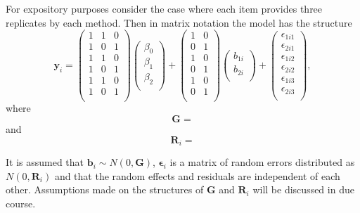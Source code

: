 \documentclass[12pt, a4paper]{report}
\theoremstyle{plain}
\theoremstyle{definition}
\theoremstyle{remark}
\begin{document}
	For expository purposes consider the case where each item provides three replicates by each method. Then in matrix notation the model has the structure
	\begin{equation}
	\boldsymbol{y}_{i} =
	\left(
	\begin{array}{ccc}
	1 & 1 & 0 \\
	1 & 0 & 1 \\
	1 & 1 & 0 \\
	1 & 0 & 1 \\
	1 & 1 & 0 \\
	1 & 0 & 1 \\
	\end{array}
	\right)
	\left(
	\begin{array}{c}         \beta_0 \\ \beta_1 \\ \beta_2 \\
	\end{array}
	\right)
	+  \left(
	\begin{array}{cc}
	1 & 0 \\
	0 & 1 \\
	1 & 0 \\
	0 & 1 \\
	1 & 0 \\
	0 & 1 \\
	\end{array}
	\right)\left(
	\begin{array}{c}
	b_{1i} \\   b_{2i} \\
	\end{array}
	\right)
	+
	\left(
	\begin{array}{c}
	\epsilon_{1i1} \\
	\epsilon_{2i1} \\
	\epsilon_{1i2} \\
	\epsilon_{2i2} \\
	\epsilon_{1i3} \\
	\epsilon_{2i3} \\
	\end{array}
	\right) ,
	\end{equation}
	where
	\[
	\boldsymbol{G} =
	\]
	and
	\[
	\boldsymbol{R}_i =
	\]
	
	It is assumed that $\boldsymbol{b}_i \sim N(0,\boldsymbol{G})$,
	$\boldsymbol{\epsilon}_i$ is a matrix of random errors distributed as $N(0,\boldsymbol{R}_i)$ and
	that the random effects and residuals are independent of each other. Assumptions made on the structures of $\boldsymbol{G}$ and $\boldsymbol{R}_i$ will be discussed in due course.
	
\end{document}
